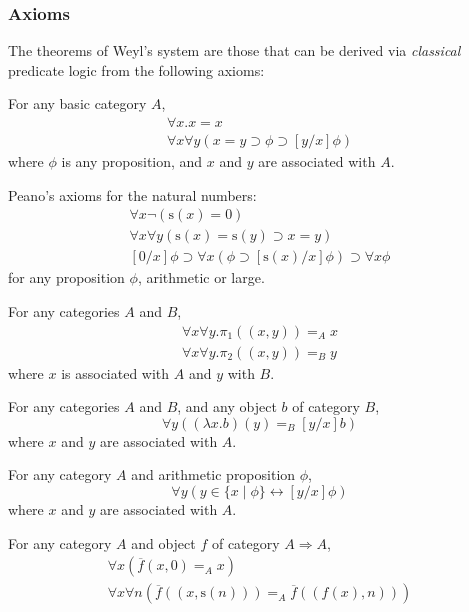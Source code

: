 \documentclass[acmtocl]{acmtrans2m}
\newcommand{\s}{\mathrm{s}}
\newcommand{\boldarrow}{\Rightarrow}
\begin{document}
\subsubsection{Axioms}
The theorems of Weyl's system are those that can be derived via \emph{classical} predicate logic from the following axioms:
\begin{longenum}
\item For any basic category $A$,
\begin{gather*}
 \forall x. x = x \\
\forall x \forall y (x = y \supset \phi \supset [y/x] \phi)
\end{gather*}
where $\phi$ is any proposition, and $x$ and $y$ are associated with $A$.
\item
Peano's axioms for the natural numbers:
\begin{gather*}
\forall x \neg (\s(x) = 0) \\
\forall x \forall y (\s(x) = \s(y) \supset x = y) \\
{[0/x]}\phi \supset \forall x (\phi \supset [\s(x) / x] \phi) \supset \forall x \phi
\end{gather*}
for any proposition $\phi$, arithmetic or large.
\item
For any categories $A$ and $B$,
\begin{gather*}
 \forall x \forall y. \pi_1((x,y)) =_A x \\
\forall x \forall y. \pi_2((x,y)) =_B y
\end{gather*}
where $x$ is associated with $A$ and $y$ with $B$.
\item
For any categories $A$ and $B$, and any object $b$ of category $B$,
\[ \forall y((\lambda x.b)(y) =_B [y/x]b) \]
where $x$ and $y$ are associated with $A$.
\item
For any category $A$ and arithmetic proposition $\phi$,
\[ \forall y(y \in \{ x \mid \phi \} \leftrightarrow [y/x]\phi) \]
where $x$ and $y$ are associated with $A$.
\item For any category $A$ and object $f$ of category $A \boldarrow A$,
\begin{gather*}
 \forall x (\overline{f}(x,0) =_A x) \\
\forall x \forall n (\overline{f}((x,\s(n))) =_A \overline{f}((f(x),n)))
\end{gather*}
\end{longenum}
\end{document}
